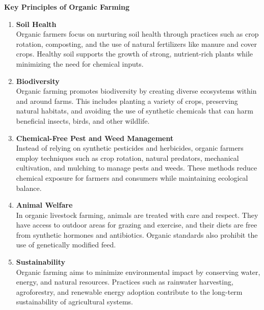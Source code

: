 \documentclass[12pt]{article}
\begin{document}
	\noindent \textbf{Key Principles of Organic Farming}
	\begin{enumerate}[label=\textbf{\arabic*.}]
		\item \textbf{Soil Health} \\
		Organic farmers focus on nurturing soil health through practices such as crop rotation, composting, and the use of natural fertilizers like manure and cover crops. Healthy soil supports the growth of strong, nutrient-rich plants while minimizing the need for chemical inputs.

		\item \textbf{Biodiversity} \\
		Organic farming promotes biodiversity by creating diverse ecosystems within and around farms. This includes planting a variety of crops, preserving natural habitats, and avoiding the use of synthetic chemicals that can harm beneficial insects, birds, and other wildlife.

		\item \textbf{Chemical-Free Pest and Weed Management} \\
		Instead of relying on synthetic pesticides and herbicides, organic farmers employ techniques such as crop rotation, natural predators, mechanical cultivation, and mulching to manage pests and weeds. These methods reduce chemical exposure for farmers and consumers while maintaining ecological balance.  \newpage

		\item \textbf{Animal Welfare} \\
		In organic livestock farming, animals are treated with care and respect. They have access to outdoor areas for grazing and exercise, and their diets are free from synthetic hormones and antibiotics. Organic standards also prohibit the use of genetically modified feed.

		\item \textbf{Sustainability} \\
		Organic farming aims to minimize environmental impact by conserving water, energy, and natural resources. Practices such as rainwater harvesting, agroforestry, and renewable energy adoption contribute to the long-term sustainability of agricultural systems.
	\end{enumerate}
\end{document}
